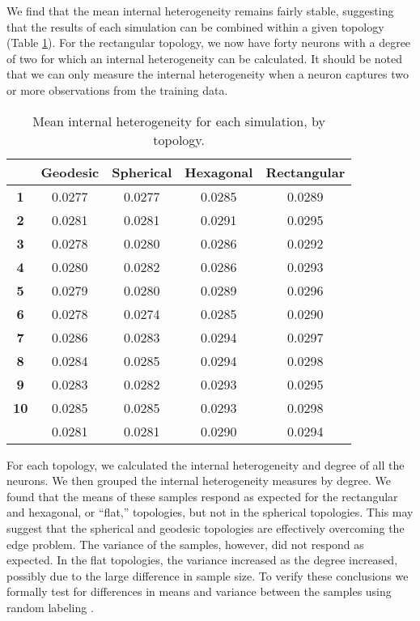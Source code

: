  We find that the
mean internal heterogeneity remains fairly stable, suggesting that the results
of each simulation can be combined within a given topology (Table
\ref{ivtable3}).  For the rectangular
topology, we now have forty neurons with a degree of two for which an internal
heterogeneity can be calculated. It should be noted that we can only measure the
internal heterogeneity when a neuron captures two or more observations from the
training data.

\begin{table}[hbt]
\centering
\caption{Mean internal heterogeneity for each simulation, by topology.}
\label{ivtable3}
\begin{tabular}{|c||c|c|c|c|}
\hline
\textbf{} & Geodesic & Spherical & Hexagonal & Rectangular \\
\hline
\hline
\textbf{1} & 0.0277 & 0.0277 & 0.0285 & 0.0289 \\
\textbf{2} & 0.0281 & 0.0281 & 0.0291 & 0.0295 \\
\textbf{3} & 0.0278 & 0.0280 & 0.0286 & 0.0292 \\
\textbf{4} & 0.0280 & 0.0282 & 0.0286 & 0.0293 \\
\textbf{5} & 0.0279 & 0.0280 & 0.0289 & 0.0296 \\
\textbf{6} & 0.0278 & 0.0274 & 0.0285 & 0.0290 \\
\textbf{7} & 0.0286 & 0.0283 & 0.0294 & 0.0297 \\
\textbf{8} & 0.0284 & 0.0285 & 0.0294 & 0.0298 \\
\textbf{9} & 0.0283 & 0.0282 & 0.0293 & 0.0295 \\
\textbf{10}& 0.0285 & 0.0285 & 0.0293 & 0.0298 \\
\hline
\hline
& 0.0281 & 0.0281 & 0.0290 & 0.0294\\
\hline
\end{tabular} \end{table}

For each topology, we calculated the internal heterogeneity and degree of all
the neurons.  We then grouped the internal heterogeneity measures by degree.  We
found that the means of these samples respond as expected for the rectangular
and hexagonal, or ``flat,''  topologies, but not in the spherical topologies.
This may suggest that the spherical and geodesic topologies are effectively
overcoming the edge problem.  The variance of the samples, however, did not
respond as expected.  In the flat topologies, the variance increased as the
degree increased, possibly due to the large difference in sample size.  To
verify these conclusions we formally test for differences in means and variance
between the samples using random labeling \cite{siss2004}.

